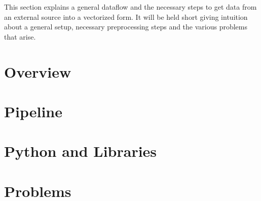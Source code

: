 
This section explains a general dataflow and the necessary steps to get data from an external source into a vectorized form. It will be held short giving intuition about a general setup, necessary preprocessing steps and the various problems that arise.

\section{Overview}
\section{Pipeline}
\section{Python and Libraries}
\section{Problems}